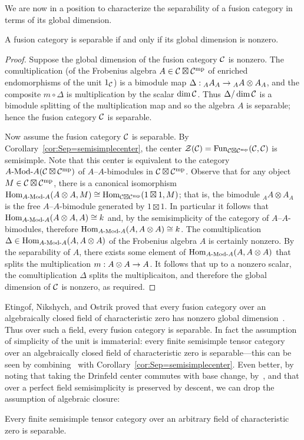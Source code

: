 \documentclass{amsart}
\begin{document}
We are now in a position to characterize the separability of a fusion category in terms of its global dimension.
\begin{theorem} \label{thm:NonzeroDimension}
A fusion category is separable if and only if its global dimension is nonzero.
\end{theorem}
\begin{proof}
Suppose the global dimension of the fusion category $\mathcal C$ is nonzero.  The comultiplication (of the Frobenius algebra $A \in \mathcal C \boxtimes \mathcal C^{\mathrm{mp}}$ of enriched endomorphisms of the unit $1_\mathcal C$) is a bimodule map $\Delta: {}_A A_A \rightarrow {}_A A \otimes A_A$, and the composite $m \circ \Delta$ is multiplication by the scalar $\dim \mathcal C$.  Thus $\Delta / \dim \mathcal C$ is a bimodule splitting of the multiplication map and so the algebra $A$ is separable; hence the fusion category $\mathcal C$ is separable.

Now assume the fusion category $\mathcal C$ is separable.  By Corollary~\ref{cor:Sep=semisimplecenter}, the center $\mathcal Z(\mathcal C) = \operatorname{Fun}_{\mathcal C \boxtimes \mathcal C^{\mathrm{mp}}}(\mathcal C,\mathcal C)$ is semisimple.  Note that this center is equivalent to the category $\Mod{A}{A}(\cC \boxtimes \cC^\mp)$ of $A$--$A$-bimodules in $\mathcal C \boxtimes \mathcal C^{\mathrm{mp}}$.  Observe that for any object $M \in \mathcal C \boxtimes \mathcal C^{\mathrm{mp}}$, there is a canonical isomorphism $\Hom_{\Mod{A}{A}}(A \otimes A,M) \cong \Hom_{\cC \boxtimes \cC^\mp}(1 \boxtimes 1,M)$; that is, the bimodule ${}_A A \otimes A_A$ is the free $A$--$A$-bimodule generated by $1 \boxtimes 1$.  In particular it follows that $\Hom_{\Mod{A}{A}}(A \otimes A, A) \cong k$ and, by the semisimplicity of the category of $A$--$A$-bimodules, therefore $\Hom_{\Mod{A}{A}}(A, A \otimes A) \cong k$.  The comultiplication $\Delta \in \Hom_{\Mod{A}{A}}(A, A \otimes A)$ of the Frobenius algebra $A$ is certainly nonzero.  By the separability of $A$, there exists some element of $\Hom_{\Mod{A}{A}}(A, A \otimes A)$ that splits the multiplication $m: A \otimes A \rightarrow A$.  It follows that up to a nonzero scalar, the comultiplication $\Delta$ splits the multiplicaiton, and therefore the global dimension of $\mathcal C$ is nonzero, as required.
\end{proof}

Etingof, Nikshych, and Ostrik proved that every fusion category over an algebraically closed field of characteristic zero has nonzero global dimension~\cite[Thm. 2.3]{MR2183279}.  Thus over such a field, every fusion category is separable.  In fact the assumption of simplicity of the unit is immaterial: every finite semisimple tensor category over an algebraically closed field of characteristic zero is separable---this can be seen by combining~\cite[Thm 2.18]{MR2183279} with Corollary~\ref{cor:Sep=semisimplecenter}.  Even better, by noting that taking the Drinfeld center commutes with base change, by~\cite[Lemma 5.1]{1002.0168}, and that over a perfect field semisimplicity is preserved by descent, we can drop the assumption of algebraic closure: %
\begin{corollary} \label{cor:charzerosep}
Every finite semisimple tensor category over an arbitrary field of characteristic zero is separable.
\end{corollary}
\end{document}
